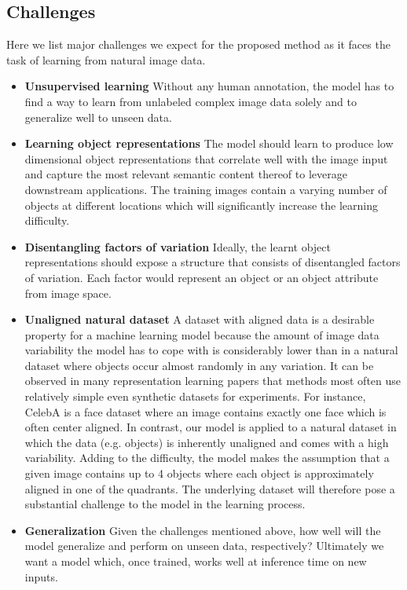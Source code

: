 \documentclass[12pt,a4paper]{article}
\begin{document}
\subsection{Challenges}
Here we list major challenges we expect for the proposed method as it faces the task of learning from natural image data.
\begin{itemize}
  \item \textbf{Unsupervised learning} Without any human annotation, the model has to find a way to learn from unlabeled complex image data solely and to generalize well to unseen data.
  \item \textbf{Learning object representations} The model should learn to produce low dimensional object representations that correlate well with the image input and capture the most relevant semantic content thereof to leverage downstream applications. The training images contain a varying number of objects at different locations which will significantly increase the learning difficulty.
  \item \textbf{Disentangling factors of variation} Ideally, the learnt object representations should expose a structure that consists of disentangled factors of variation. Each factor would represent an object or an object attribute from image space.
  \item \textbf{Unaligned natural dataset} A dataset with aligned data is a desirable property for a machine learning model because the amount of image data variability the model has to cope with is considerably lower than in a natural dataset where objects occur almost randomly in any variation. It can be observed in many representation learning papers that methods most often use relatively simple even synthetic datasets for experiments. For instance, CelebA is a face dataset where an image contains exactly one face which is often center aligned. In contrast, our model is applied to a natural dataset in which the data (e.g. objects) is inherently unaligned and comes with a high variability. Adding to the difficulty, the model makes the assumption that a given image contains up to 4 objects where each object is approximately aligned in one of the quadrants. The underlying dataset will therefore pose a substantial challenge to the model in the learning process.
  \item \textbf{Generalization} Given the challenges mentioned above, how well will the model generalize and perform on unseen data, respectively? Ultimately we want a model which, once trained, works well at inference time on new inputs. 
\end{itemize}
\end{document}
